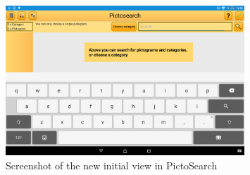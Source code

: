 \begin{figure}[h]
    \centering
    \includegraphics[width=0.8\textwidth]{figures/img/screenshots/new_startup.png}
    \caption{Screenshot of the new initial view in PictoSearch}\label{fig:screenshot_newstartup}
\end{figure}
